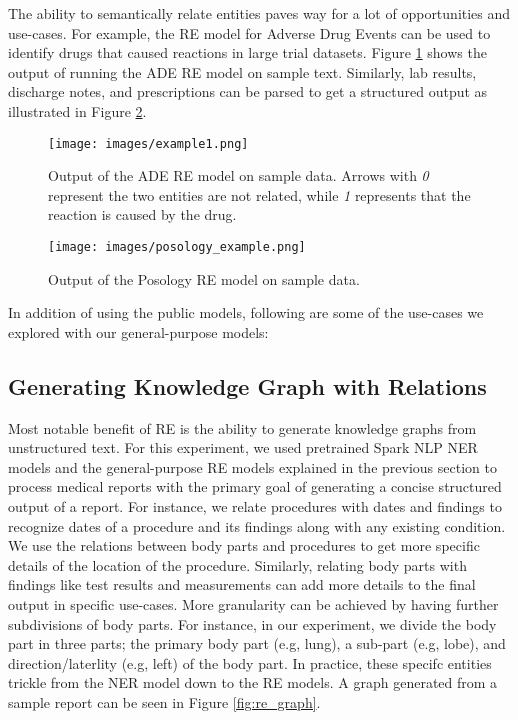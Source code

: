 \documentclass[letterpaper]{article}
\begin{document}
The ability to semantically relate entities paves way for a lot of opportunities and use-cases. For example, the RE model for Adverse Drug Events can be used to identify drugs that caused reactions in large trial datasets. Figure \ref{fig:ade_example} shows the output of running the ADE RE model on sample text. Similarly, lab results, discharge notes, and prescriptions can be parsed to get a structured output as illustrated in Figure \ref{fig:posology_example}.

\begin{figure}[h!]
  \texttt{[image: images/example1.png]}
  \caption{Output of the ADE RE model on sample data. Arrows with \textit{0} represent the two entities are not related, while \textit{1} represents that the reaction is caused by the drug.}
  \label{fig:ade_example}
\end{figure}

\begin{figure}[h!]
  \texttt{[image: images/posology\_example.png]}
  \caption{Output of the Posology RE model on sample data.}
  \label{fig:posology_example}
\end{figure}

In addition of using the public models, following are some of the use-cases we explored with our general-purpose models:

\subsection{Generating Knowledge Graph with Relations}
Most notable benefit of RE is the ability to generate knowledge graphs from unstructured text. For this experiment, we used pretrained Spark NLP NER models and the general-purpose RE models explained in the previous section to process medical reports with the primary goal of generating a concise structured output of a report. For instance, we relate procedures with dates and findings to recognize dates of a procedure and its findings along with any existing condition. We use the relations between body parts and procedures to get more specific details of the location of the procedure. Similarly, relating body parts with findings like test results and measurements can add more details to the final output in specific use-cases. More granularity can be achieved by having further subdivisions of body parts. For instance, in our experiment, we divide the body part in three parts; the primary body part (e.g, lung), a sub-part (e.g, lobe), and direction/laterlity (e.g, left) of the body part. In practice, these specifc entities trickle from the NER model down to the RE models. A graph generated from a sample report can be seen in Figure \ref{fig:re_graph}.
\end{document}
